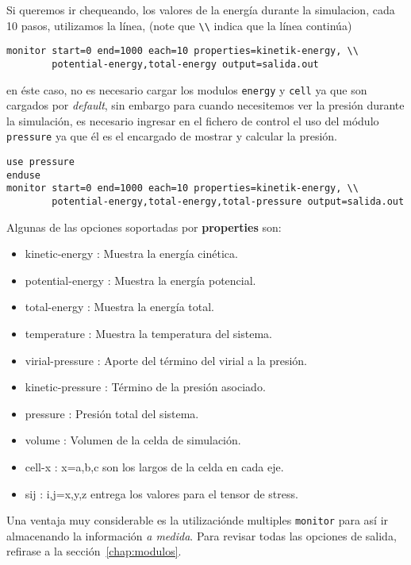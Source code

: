 Si queremos ir chequeando, los valores de la energ\'ia durante la simulacion, cada 10 pasos, utilizamos la l\'inea, (note que \verb|\\| indica que la l\'inea contin\'ua)

\begin{verbatim}
monitor start=0 end=1000 each=10 properties=kinetik-energy, \\
        potential-energy,total-energy output=salida.out
\end{verbatim}

en \'este caso, no es necesario cargar los modulos \verb|energy| y \verb|cell| ya que son cargados por \textit{default}, sin embargo para cuando necesitemos ver la presi\'on durante la simulaci\'on, es necesario ingresar en el fichero de control el uso del m\'odulo \verb|pressure| ya que \'el es el encargado de mostrar y calcular la presi\'on.

\begin{verbatim}
use pressure
enduse
monitor start=0 end=1000 each=10 properties=kinetik-energy, \\
        potential-energy,total-energy,total-pressure output=salida.out
\end{verbatim}

Algunas de las opciones soportadas por \textbf{properties} son:

\begin{itemize}
 \item kinetic-energy : Muestra la energ\'ia cin\'etica.
 \item potential-energy : Muestra la energ\'ia potencial.
 \item total-energy : Muestra la energ\'ia total.
 \item temperature : Muestra la temperatura del sistema.
 \item virial-pressure : Aporte del t\'ermino del virial a la presi\'on.
 \item kinetic-pressure : T\'ermino de la presi\'on asociado.
 \item pressure : Presi\'on total del sistema.
 \item volume : Volumen de la celda de simulaci\'on.
 \item cell-x : x=a,b,c son los largos de la celda en cada eje.
 \item sij : i,j=x,y,z entrega los valores para el tensor de stress.
\end{itemize}

Una ventaja muy considerable es la utilizaci\'onde multiples \verb|monitor| para as\'i ir almacenando la informaci\'on \textit{a medida}. Para revisar todas las opciones de salida, refirase a la secci\'on~\ref{chap:modulos}.

